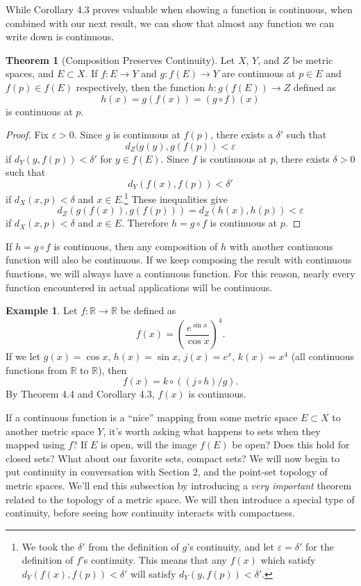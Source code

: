 \documentclass{article}
\newcommand{\R}{\mathbb{R}}
\theoremstyle{definition}
\newtheorem{theorem}{Theorem}[section]
\newtheorem{example}{Example}[section]
\begin{document}
	While Corollary 4.3 proves valuable when showing a function is continuous, when combined with our next result, we can show that almost any function we can write down is continuous.  
	\begin{theorem}[Composition Preserves Continuity]
		Let $ X $, $ Y $, and $ Z $ be metric spaces, and $ E\subset X $. If $ f:E\to Y $ and $ g:f(E)\to Y $ are continuous at $ p\in E $ and $ f(p)\in f(E) $ respectively, then the function $ h:g(f(E))\to Z $ defined as  $$ h(x)=g(f(x))=(g\circ f)(x)$$ is continuous at $ p $. 
	\end{theorem}
	\begin{proof}
		Fix $ \varepsilon>0 $. Since $ g $ is continuous at $ f(p) $, there exists a $ \delta' $ such that $$d_Z(g(y),g(f(p))<\varepsilon $$ if $ d_Y(y,f(p))<\delta' $ for $ y\in f(E) $. Since $ f $ is continuous at $ p $, there exists $ \delta>0 $ such that $$d_Y(f(x),f(p))<\delta' $$ if $ d_X(x,p)<\delta $ and $ x\in E $.\footnote{We took the $ \delta' $ from the definition of $ g $'s continuity, and let $ \varepsilon=\delta' $ for the definition of $ f $'s continuity. This means that any $ f(x) $ which satisfy $ d_Y(f(x),f(p))<\delta'  $ will satisfy $ d_Y(y,f(p))<\delta' $.} These inequalities give $$d_Z(g(f(x)),g(f(p)))=d_Z(h(x),h(p))<\varepsilon $$ if $ d_X(x,p)<\delta $ and $ x\in E $. Therefore $ h=g\circ f $ is continuous at $ p $. 
	\end{proof}
	If $ h=g\circ f $ is continuous, then any composition of $ h $ with another continuous function will also be continuous. If we keep composing the result with continuous functions, we will always have a continuous function. For this reason, nearly every function encountered in actual applications will be continuous.   
	\begin{example}
		Let $ f:\R\to\R $ be defined as $$ f(x)=\left(\frac{e^{\sin x}}{\cos x}\right)^4 .$$ If we let $ g(x)=\cos x $, $ h(x)=\sin  x $, $ j(x)=e^x $, $ k(x)=x^4 $ (all continuous functions from $ \R $ to $ \R $), then $$f(x)=k\circ((j\circ h)/g).$$ By Theorem 4.4 and Corollary 4.3, $ f(x) $ is continuous. 
	\end{example}
	If a continuous function is a ``nice'' mapping from some metric space $ E\subset X $ to another metric space $ Y $, it's worth asking what happens to sets when they mapped using $ f $? If $ E $ is open, will the image $ f(E) $ be open? Does this hold for closed sets? What about our favorite sets, compact sets? We will now begin to put continuity in conversation with Section 2, and the point-set topology of metric spaces. We'll end this subsection by introducing a \textit{very important} theorem related to the topology of a metric space. We will then introduce a special type of continuity, before seeing how continuity interacts with compactness.
\end{document}
